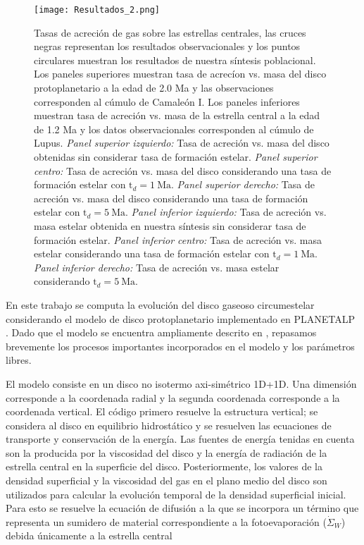 \documentclass[baaa]{baaa}
\begin{document}
\begin{figure*}[!ht]


\centering

\texttt{[image: Resultados\_2.png]}

\caption{Tasas de acreción de gas sobre las estrellas centrales, las cruces negras representan los resultados observacionales \citep{manara2023ASPC} y los puntos circulares muestran los resultados de nuestra síntesis poblacional. Los paneles superiores muestran tasa de acrecíon vs. masa del disco protoplanetario a la edad de 2.0 Ma y las observaciones corresponden al cúmulo de Camaleón I. Los paneles inferiores muestran tasa de acreción vs. masa de la estrella central a la edad de 1.2 Ma y los datos observacionales corresponden al cúmulo de Lupus. \emph{Panel superior izquierdo:} Tasa de acreción vs. masa del disco obtenidas sin considerar tasa de formación estelar. \emph{Panel superior centro:} Tasa de acreción vs. masa del disco considerando una tasa de formación estelar con $\mathrm{t}_{d}=1~\mathrm{Ma}$. \emph{Panel superior derecho:} Tasa de acreción vs. masa del disco considerando una tasa de formación estelar con $\mathrm{t}_{d}=5~\mathrm{Ma}$. \emph{Panel inferior izquierdo:} Tasa de acreción vs. masa estelar obtenida en nuestra síntesis sin considerar tasa de formación estelar. \emph{Panel inferior centro:} Tasa de acreción vs. masa estelar considerando una tasa de formación estelar con $\mathrm{t}_{d}=1~\mathrm{Ma}$. \emph{Panel inferior derecho:} Tasa de acreción vs. masa estelar considerando $\mathrm{t}_{d}=5~\mathrm{Ma}$.  
}

\label{Figura3}

\end{figure*}





En este trabajo se computa la evolución del disco gaseoso circumestelar considerando el modelo de disco protoplanetario implementado en {\scriptsize PLANETALP} \citep[e.g.][]{pronco2017, Octavio2017}. Dado que el modelo se encuentra ampliamente descrito en \cite{Octavio2017}, repasamos brevemente los procesos importantes incorporados en el modelo y los parámetros libres.



El modelo consiste en un disco no isotermo axi-simétrico 1D+1D. Una dimensión corresponde a la coordenada radial y la segunda coordenada corresponde a la coordenada vertical. El código primero resuelve la estructura vertical; se considera al disco en equilibrio hidrostático y se resuelven las ecuaciones de transporte y conservación de la energía. Las fuentes de energía tenidas en cuenta son la producida por la viscosidad del disco y la energía de radiación de la estrella central en la superficie del disco. Posteriormente, los valores de la densidad superficial y la viscosidad del gas en el plano medio del disco son utilizados para calcular la evolución temporal de la densidad superficial inicial. Para esto se resuelve la ecuación de difusión a la que se incorpora un término que representa un sumidero de material correspondiente a la fotoevaporaci\'on ($\dot{\Sigma}_W $) debida únicamente a la estrella central \citep[e.g]{pringle1981accretion, Octavio2017}
\end{document}
